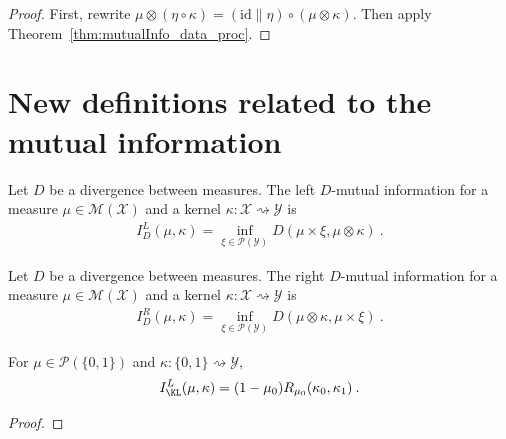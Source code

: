 \begin{proof}%
{}
First, rewrite $\mu \otimes (\eta \circ \kappa) = (\mathrm{id} \parallel \eta) \circ (\mu \otimes \kappa)$. Then apply Theorem~\ref{thm:mutualInfo_data_proc}.
\end{proof}




\section{New definitions related to the mutual information}

\begin{definition}
  \label{def:mutualInfoLeft}
  Let $D$ be a divergence between measures.
  The left $D$-mutual information for a measure $\mu \in \mathcal M(\mathcal X)$ and a kernel $\kappa : \mathcal X \rightsquigarrow \mathcal Y$ is
  \begin{align*}
  I_D^L(\mu, \kappa) = \inf_{\xi \in \mathcal P(\mathcal Y)} D(\mu \times \xi, \mu \otimes \kappa) \: .
  \end{align*}
\end{definition}


\begin{definition}
  \label{def:mutualInfoRight}
  Let $D$ be a divergence between measures.
  The right $D$-mutual information for a measure $\mu \in \mathcal M(\mathcal X)$ and a kernel $\kappa : \mathcal X \rightsquigarrow \mathcal Y$ is
  \begin{align*}
  I_D^R(\mu, \kappa) = \inf_{\xi \in \mathcal P(\mathcal Y)} D(\mu \otimes \kappa, \mu \times \xi) \: .
  \end{align*}
\end{definition}


\begin{lemma}
  \label{lem:mutualInfoLeft_eq_renyi}
  For $\mu \in \mathcal P(\{0,1\})$ and $\kappa : \{0,1\} \rightsquigarrow \mathcal Y$,
  \begin{align*}
  I_{\KL}^L(\mu, \kappa) = (1 - \mu_0) R_{\mu_0}(\kappa_0, \kappa_1) \: .
  \end{align*}
\end{lemma}

\begin{proof}%
{}

\end{proof}


